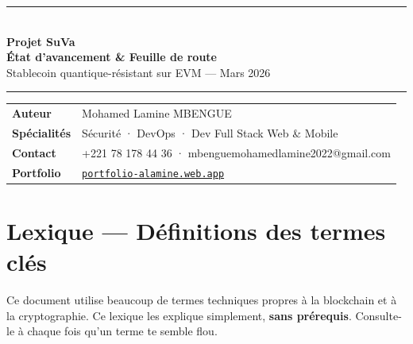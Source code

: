 \documentclass[12pt, a4paper]{article}
\begin{document}
\begin{center}
  {\color{suva_blue}\rule{\linewidth}{2pt}}\\[0.5cm]
  {\Huge\bfseries\color{suva_blue} Projet SuVa}\\[0.3cm]
  {\large\bfseries État d'avancement \& Feuille de route}\\[0.2cm]
  {\small\color{gray} Stablecoin quantique-résistant sur EVM --- Mars 2026}\\[0.3cm]
  {\color{suva_blue}\rule{\linewidth}{2pt}}
\end{center}

\vspace{0.3cm}
\begin{tcolorbox}[colback=suva_blue!5, colframe=suva_blue!40,
  left=6pt, right=6pt, top=4pt, bottom=4pt]
\small
\begin{tabular}{ll}
  \textbf{Auteur}      & Mohamed Lamine MBENGUE \\
  \textbf{Spécialités} & Sécurité · DevOps · Dev Full Stack Web \& Mobile \\
  \textbf{Contact}     & +221 78 178 44 36 · mbenguemohamedlamine2022@gmail.com \\
  \textbf{Portfolio}   & \href{https://portfolio-alamine.web.app}{\texttt{portfolio-alamine.web.app}} \\
\end{tabular}
\end{tcolorbox}
\vspace{0.3cm}

\tableofcontents
\newpage

\section{Lexique --- Définitions des termes clés}

\begin{tcolorbox}[colback=suva_blue!4, colframe=suva_blue!60,
  title=\textbf{Comment utiliser ce lexique},
  fonttitle=\bfseries, breakable]
Ce document utilise beaucoup de termes techniques propres à la blockchain et à la cryptographie.
Ce lexique les explique simplement, \textbf{sans prérequis}. Consulte-le à chaque fois qu'un
terme te semble flou.
\end{tcolorbox}

\vspace{0.4cm}
\end{document}
